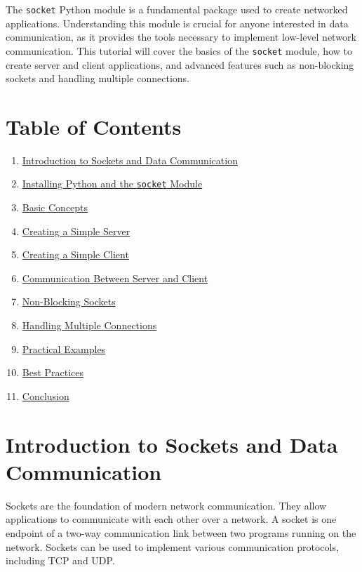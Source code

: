 \documentclass[
  letterpaper,
  DIV=11,
  numbers=noendperiod]{scrreprt}
\providecommand{\tightlist}{%
  \setlength{\itemsep}{0pt}\setlength{\parskip}{0pt}}\usepackage{longtable,booktabs,array}
\begin{document}
The \texttt{socket} Python module is a fundamental package used to
create networked applications. Understanding this module is crucial for
anyone interested in data communication, as it provides the tools
necessary to implement low-level network communication. This tutorial
will cover the basics of the \texttt{socket} module, how to create
server and client applications, and advanced features such as
non-blocking sockets and handling multiple connections.

\section{Table of Contents}\label{table-of-contents-17}

\begin{enumerate}
\def\labelenumi{\arabic{enumi}.}
\tightlist
\item
  \hyperref[introduction-to-sockets-and-data-communication]{Introduction
  to Sockets and Data Communication}
\item
  \hyperref[installing-python-and-the-socket-module]{Installing Python
  and the \texttt{socket} Module}
\item
  \hyperref[basic-concepts]{Basic Concepts}
\item
  \hyperref[creating-a-simple-server]{Creating a Simple Server}
\item
  \hyperref[creating-a-simple-client]{Creating a Simple Client}
\item
  \hyperref[communication-between-server-and-client]{Communication
  Between Server and Client}
\item
  \hyperref[non-blocking-sockets]{Non-Blocking Sockets}
\item
  \hyperref[handling-multiple-connections]{Handling Multiple
  Connections}
\item
  \hyperref[practical-examples]{Practical Examples}
\item
  \hyperref[best-practices]{Best Practices}
\item
  \hyperref[conclusion]{Conclusion}
\end{enumerate}

\section{Introduction to Sockets and Data
Communication}\label{introduction-to-sockets-and-data-communication}

Sockets are the foundation of modern network communication. They allow
applications to communicate with each other over a network. A socket is
one endpoint of a two-way communication link between two programs
running on the network. Sockets can be used to implement various
communication protocols, including TCP and UDP.
\end{document}
